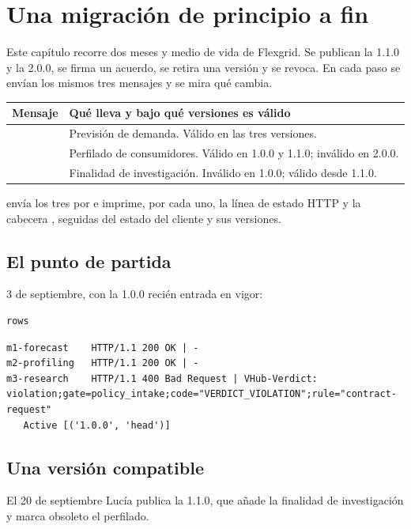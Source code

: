 \chapter{Una migración de principio a fin}
\label{ch:migracion}

Este capítulo recorre dos meses y medio de vida de Flexgrid. Se publican la 1.1.0 y la 2.0.0, se firma un
acuerdo, se retira una versión y se revoca. En cada paso se envían los mismos tres mensajes y se mira qué
cambia.

\noindent\begin{tabularx}{\linewidth}{@{}L{2.8cm}Y@{}}
\toprule
\textbf{Mensaje} & \textbf{Qué lleva y bajo qué versiones es válido} \\
\midrule
{} & Previsión de demanda. Válido en las tres versiones. \\
 & Perfilado de consumidores. Válido en 1.0.0 y 1.1.0; inválido en 2.0.0. \\
 & Finalidad de investigación. Inválido en 1.0.0; válido desde 1.1.0. \\
\bottomrule
\end{tabularx}

\medskip
{} envía los tres por  e imprime, por cada uno, la línea de estado HTTP y la cabecera
, seguidas del estado del cliente y sus versiones.

\section{El punto de partida}

3 de septiembre, con la 1.0.0 recién entrada en vigor:

\begin{lstlisting}[style=sh]
rows
\end{lstlisting}
\begin{lstlisting}[style=out]
m1-forecast    HTTP/1.1 200 OK | -
m2-profiling   HTTP/1.1 200 OK | -
m3-research    HTTP/1.1 400 Bad Request | VHub-Verdict: violation;gate=policy_intake;code="VERDICT_VIOLATION";rule="contract-request"
   Active [('1.0.0', 'head')]
\end{lstlisting}

\section{Una versión compatible}

El 20 de septiembre Lucía publica la 1.1.0, que añade la finalidad de investigación y marca obsoleto el
perfilado.

